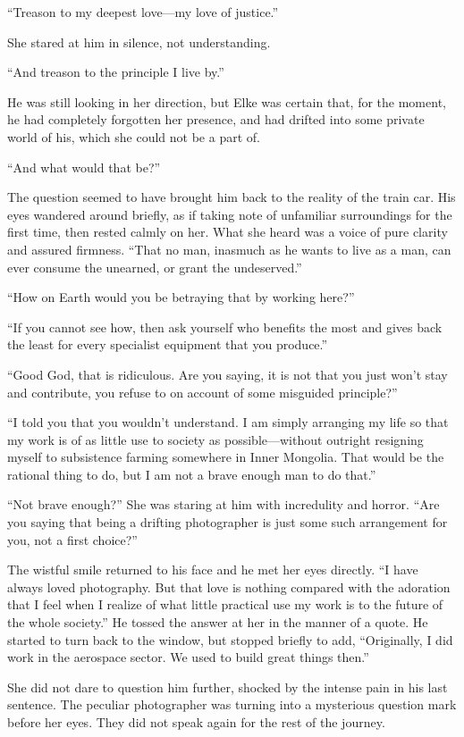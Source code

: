 ``Treason to my deepest love---my love of justice.''

She stared at him in silence, not understanding.

``And treason to the principle I live by.''

He was still looking in her direction, but Elke was certain that, for the moment, he had completely forgotten her presence, and had drifted into some private world of his, which she could not be a part of.

``And what would that be?''

The question seemed to have brought him back to the reality of the train car. His eyes wandered around briefly, as if taking note of unfamiliar surroundings for the first time, then rested calmly on her. What she heard was a voice of pure clarity and assured firmness. ``That no man, inasmuch as he wants to live as a man, can ever consume the unearned, or grant the undeserved.''

``How on Earth would you be betraying that by working here?''

``If you cannot see how, then ask yourself who benefits the most and gives back the least for every specialist equipment that you produce.''

``Good God, that is ridiculous. Are you saying, it is not that you just won't stay and contribute, you refuse to on account of some misguided principle?''

``I told you that you wouldn't understand. I am simply arranging my life so that my work is of as little use to society as possible---without outright resigning myself to subsistence farming somewhere in Inner Mongolia. That would be the rational thing to do, but I am not a brave enough man to do that.''

``Not brave enough?'' She was staring at him with incredulity and horror. ``Are you saying that being a drifting photographer is just some such arrangement for you, not a first choice?''

The wistful smile returned to his face and he met her eyes directly. ``I have always loved photography. But that love is nothing compared with the adoration that I feel when I realize of what little practical use my work is to the future of the whole society.'' He tossed the answer at her in the manner of a quote. He started to turn back to the window, but stopped briefly to add, ``Originally, I did work in the aerospace sector. We used to build great things then.''

She did not dare to question him further, shocked by the intense pain in his last sentence. The peculiar photographer was turning into a mysterious question mark before her eyes. They did not speak again for the rest of the journey.

